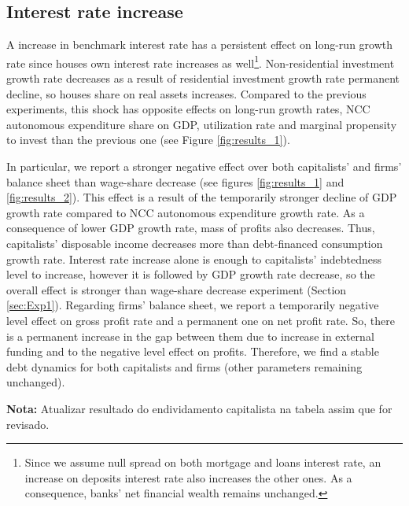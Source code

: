 \documentclass[11pt]{article}
\begin{document}
\subsection{Interest rate increase}
\label{sec:org5b867fb}
\label{sec:Exp3}

A increase in benchmark interest rate  has a persistent effect on long-run growth rate since houses own interest rate increases as well\footnote{Since we assume null spread on both mortgage and loans interest rate, an increase on deposits interest rate also increases the other ones. As a consequence, banks' net financial wealth remains unchanged.}.
Non-residential investment growth rate decreases as a result of residential investment growth rate permanent decline, so houses share on real assets increases.
Compared to the previous experiments, this shock has opposite effects on long-run growth rates, NCC autonomous expenditure share on GDP, utilization rate and marginal propensity to invest  than the previous one (see Figure \ref{fig:results_1}).


In particular, we report a stronger negative effect over both capitalists' and firms' balance sheet than wage-share decrease (see figures \ref{fig:results_1} and \ref{fig:results_2}).
This effect is a result of the temporarily stronger decline of GDP growth rate compared to NCC autonomous expenditure growth rate.
As a consequence of lower GDP growth rate, mass of profits also decreases.
Thus, capitalists' disposable income decreases more than debt-financed consumption growth rate.
Interest rate increase alone is enough to capitalists' indebtedness level to increase, however it is followed by GDP growth rate decrease, so the overall effect is stronger than wage-share decrease experiment (Section \ref{sec:Exp1}).
Regarding firms' balance sheet, we report a temporarily negative level effect on gross profit rate and a permanent one on net profit rate. 
So, there is a permanent increase in the gap between them due to increase in external funding and to the negative level effect on profits.
Therefore, we find a stable debt dynamics for both capitalists and firms (other parameters remaining unchanged).

\textbf{Nota:} Atualizar resultado do endividamento capitalista na tabela assim que for revisado.
\end{document}
